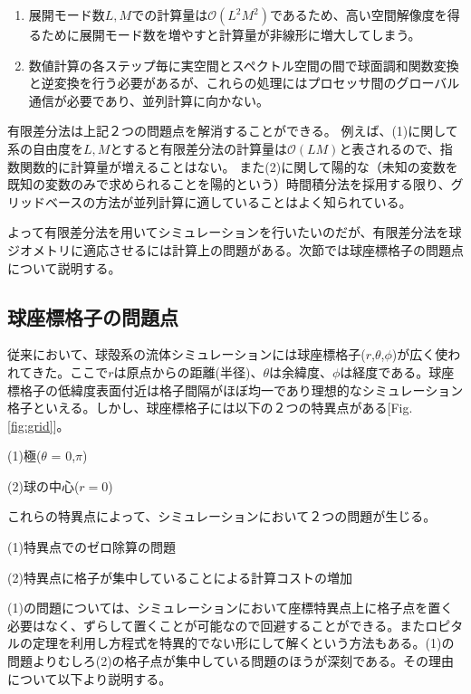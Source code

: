 \documentclass[12pt]{jsarticle}
\begin{document}
\begin{enumerate}
  \renewcommand{\labelenumi}{(\arabic{enumi})}
  \item 展開モード数$L,M$での計算量は$\mathcal{O} \left( L^2 M^2 \right)$であるため、高い空間解像度を得るために展開モード数を増やすと計算量が非線形に増大してしまう。
  \item 数値計算の各ステップ毎に実空間とスペクトル空間の間で球面調和関数変換と逆変換を行う必要があるが、これらの処理にはプロセッサ間のグローバル通信が必要であり、並列計算に向かない。
\end{enumerate}

有限差分法は上記２つの問題点を解消することができる。
例えば、(1)に関して系の自由度を$L,M$とすると有限差分法の計算量は$\mathcal{O} \left( L M \right)$と表されるので、指数関数的に計算量が増えることはない。
また(2)に関して陽的な（未知の変数を既知の変数のみで求められることを陽的という）時間積分法を採用する限り、グリッドベースの方法が並列計算に適していることはよく知られている。

よって有限差分法を用いてシミュレーションを行いたいのだが、有限差分法を球ジオメトリに適応させるには計算上の問題がある。次節では球座標格子の問題点について説明する。

\subsection{球座標格子の問題点}
従来において、球殻系の流体シミュレーションには球座標格子($r$,$\theta$,$\phi$)が広く使われてきた。ここで$r$は原点からの距離(半径)、$\theta$は余緯度、$\phi$は経度である。球座標格子の低緯度表面付近は格子間隔がほぼ均一であり理想的なシミュレーション格子といえる。しかし、球座標格子には以下の２つの特異点がある[Fig.\ref{fig:grid}]。
\begin{description}
\item{(1)}極($\theta$ = 0,$\pi$)
\item{(2)}球の中心($r = 0$)
\end{description}
これらの特異点によって、シミュレーションにおいて２つの問題が生じる。
\begin{description}
\item{(1)}特異点でのゼロ除算の問題
\item{(2)}特異点に格子が集中していることによる計算コストの増加
\end{description}

(1)の問題については、シミュレーションにおいて座標特異点上に格子点を置く必要はなく、ずらして置くことが可能なので回避することができる。またロピタルの定理を利用し方程式を特異的でない形にして解くという方法もある。(1)の問題よりむしろ(2)の格子点が集中している問題のほうが深刻である。その理由について以下より説明する。
\end{document}
